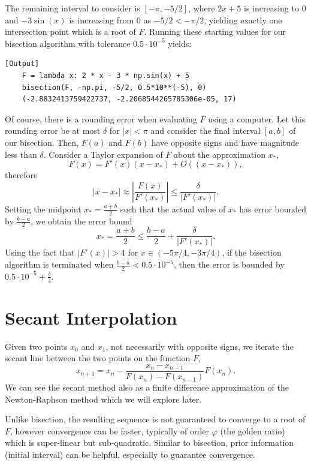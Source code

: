 \documentclass{article}
\begin{document}
The remaining interval to consider is \([-\pi, -5/2]\), where \(2x + 5\) is increasing to \(0\) and \(-3\sin(x)\) is increasing from \(0\) as \(-5/2 < -\pi/2\), yielding exactly one intersection point which is a root of \(F\). Running these starting values for our bisection algorithm with tolerance \(0.5 \cdot 10^{-5}\) yields:

\begin{verbatim}[Output]
    F = lambda x: 2 * x - 3 * np.sin(x) + 5
    bisection(F, -np.pi, -5/2, 0.5*10**(-5), 0)
    (-2.8832413759422737, -2.2068544265785306e-05, 17)
\end{verbatim}

Of course, there is a rounding error when evaluating \(F\) using a computer. Let this rounding error be at most \(\delta\) for \(|x| < \pi\) and consider the final interval \([a,b]\) of our bisection. Then, \(F(a)\) and \(F(b)\) have opposite signs and have magnitude less than \(\delta\). Consider a Taylor expansion of \(F\) about the approximation \(x_*\),
\[ F(x) = F'(x)(x - x_*) + O((x - x_*)), \]
therefore
\[ |x - x_*| \approx \left| \frac{F(x)}{F'(x_*)} \right| \leq \frac{\delta}{|F'(x_*)|}. \]
Setting the midpoint \(x_* = \frac{a+b}{2}\) such that the actual value of \(x_*\) has error bounded by \(\frac{b-a}{2}\), we obtain the error bound
\[ x_* = \frac{a+b}{2} \leq \frac{b-a}{2} + \frac{\delta}{|F'(x_*)|}. \]
Using the fact that \(|F'(x)| > 4\) for \(x \in (-5\pi/4, -3\pi/4)\), if the bisection algorithm is terminated when \(\frac{b-a}{2} < 0.5 \cdot 10^{-5}\), then the error is bounded by \(0.5 \cdot 10^{-5} + \frac{\delta}{4}\).

\section{Secant Interpolation}
Given two points \(x_0\) and \(x_1\), not necessarily with opposite signs, we iterate the secant line between the two points on the function \(F\),
\[ x_{n+1} = x_n - \frac{x_n - x_{n-1}}{F(x_n) - F(x_{n-1})}F(x_n). \]
We can see the secant method also as a finite difference approximation of the Newton-Raphson method which we will explore later.

Unlike bisection, the resulting sequence is not guaranteed to converge to a root of \(F\), however convergence can be faster, typically of order \(\varphi\) (the golden ratio) which is super-linear but sub-quadratic. Similar to bisection, prior information (initial interval) can be helpful, especially to guarantee convergence.
\end{document}
